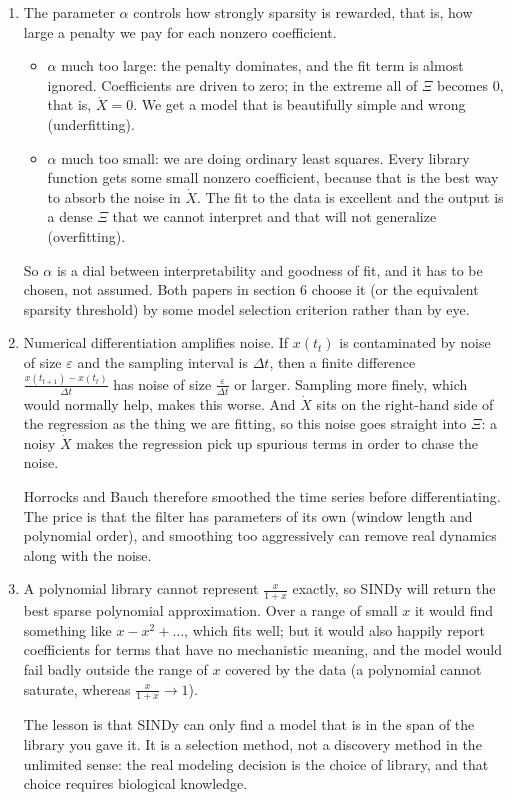 \documentclass[a4paper,12pt]{article}
\begin{document}
\begin{enumerate}[label=(\alph*)]
\item The parameter $\alpha$ controls how strongly sparsity is rewarded, that is, how large a penalty we pay for each nonzero coefficient.
\begin{itemize}
\item $\alpha$ much too large: the penalty dominates, and the fit term is almost ignored. Coefficients are driven to zero; in the extreme all of $\Xi$ becomes $0$, that is, $\dot{X}=0$. We get a model that is beautifully simple and wrong (underfitting).
\item $\alpha$ much too small: we are doing ordinary least squares. Every library function gets some small nonzero coefficient, because that is the best way to absorb the noise in $\dot{X}$. The fit to the data is excellent and the output is a dense $\Xi$ that we cannot interpret and that will not generalize (overfitting).
\end{itemize}
So $\alpha$ is a dial between interpretability and goodness of fit, and it has to be chosen, not assumed. Both papers in section 6 choose it (or the equivalent sparsity threshold) by some model selection criterion rather than by eye.

\item Numerical differentiation amplifies noise. If $x(t_t)$ is contaminated by noise of size $\varepsilon$ and the sampling interval is $\Delta t$, then a finite difference $\frac{x(t_{t+1})-x(t_t)}{\Delta t}$ has noise of size $\frac{\varepsilon}{\Delta t}$ or larger. Sampling more finely, which would normally help, makes this worse. And $\dot{X}$ sits on the right-hand side of the regression as the thing we are fitting, so this noise goes straight into $\Xi$: a noisy $\dot{X}$ makes the regression pick up spurious terms in order to chase the noise.

Horrocks and Bauch therefore smoothed the time series before differentiating. The price is that the filter has parameters of its own (window length and polynomial order), and smoothing too aggressively can remove real dynamics along with the noise.

\item A polynomial library cannot represent $\frac{x}{1+x}$ exactly, so SINDy will return the best sparse polynomial approximation. Over a range of small $x$ it would find something like $x - x^2 + \ldots$, which fits well; but it would also happily report coefficients for terms that have no mechanistic meaning, and the model would fail badly outside the range of $x$ covered by the data (a polynomial cannot saturate, whereas $\frac{x}{1+x} \to 1$).

The lesson is that SINDy can only find a model that is in the span of the library you gave it. It is a selection method, not a discovery method in the unlimited sense: the real modeling decision is the choice of library, and that choice requires biological knowledge.
\end{enumerate}
\end{document}
